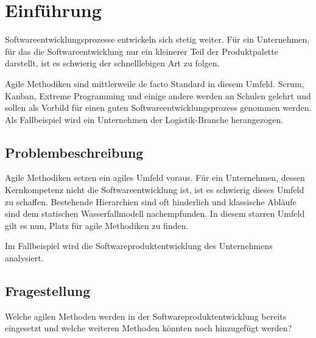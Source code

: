 \chapter{Einführung}\label{chap:intro}
\chapterstart


Softwareentwicklungsprozesse entwickeln sich stetig weiter. Für ein Unternehmen, für das die Softwareentwicklung nur ein kleinerer Teil der Produktpalette darstellt, ist es schwierig der schnelllebigen Art zu folgen.

Agile Methodiken sind mittlerweile de facto Standard in diesem Umfeld. Scrum, Kanban, Extreme Programming und einige andere werden an Schulen gelehrt und sollen als Vorbild für einen guten Softwareentwicklungsprozess genommen werden. Als Fallbeispiel wird ein Unternehmen der Logistik-Branche herangezogen. 

\section{Problembeschreibung}\label{sec:problem}

Agile Methodiken setzen ein agiles Umfeld voraus. Für ein Unternehmen, dessen 
Kernkompetenz nicht die Softwareentwicklung ist, ist es schwierig dieses 
Umfeld zu schaffen. Bestehende Hierarchien sind oft hinderlich und klassische Abläufe sind dem statischen Wasserfallmodell nachempfunden. In diesem starren Umfeld gilt es nun, Platz für agile Methodiken zu finden.

Im Fallbeispiel wird die Softwareproduktentwicklung des Unternehmens analysiert. 

\section{Fragestellung}\label{sec:rq}

Welche agilen Methoden werden in der Softwareproduktentwicklung bereits eingesetzt und welche weiteren Methoden könnten noch hinzugefügt werden? 

\chapterend

